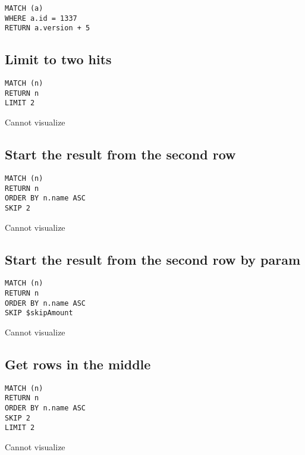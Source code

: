 \begin{lstlisting}
MATCH (a)
WHERE a.id = 1337
RETURN a.version + 5
\end{lstlisting}

\subsection{Limit to two hits}

\begin{lstlisting}
MATCH (n)
RETURN n
LIMIT 2
\end{lstlisting}

Cannot visualize
\subsection{Start the result from the second row}

\begin{lstlisting}
MATCH (n)
RETURN n
ORDER BY n.name ASC
SKIP 2
\end{lstlisting}

Cannot visualize
\subsection{Start the result from the second row by param}

\begin{lstlisting}
MATCH (n)
RETURN n
ORDER BY n.name ASC
SKIP $skipAmount
\end{lstlisting}

Cannot visualize
\subsection{Get rows in the middle}

\begin{lstlisting}
MATCH (n)
RETURN n
ORDER BY n.name ASC
SKIP 2
LIMIT 2
\end{lstlisting}

Cannot visualize
